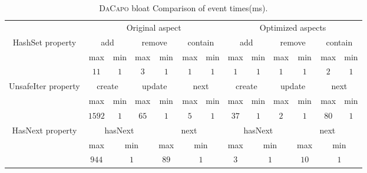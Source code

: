 \begin{table*}[ht]
\centering
\scriptsize
\begin{tabular}{|c|c|c|c|c|c|c||c|c|c|c|c|c|}
\hline
\multirow{1}{*}{}                                                                
     & \multicolumn{6}{c||}{Original aspect} & 
\multicolumn{6}{c|}{Optimized aspects} \\ \cline{1-13} 
                                                                                 
 \multirow{3}{*}{HashSet property}    & \multicolumn{2}{c|}{add}  &
 \multicolumn{2}{c|}{remove} & \multicolumn{2}{c||}{contain} &
 \multicolumn{2}{c|}{add}   &
 \multicolumn{2}{c|}{remove} & \multicolumn{2}{c|}{contain}         \\ \cline{2-13} 
 & max & min & max & min & max & min & max & min & max & min & max & min
 \\\cline{2-13}  
 &  $11$ & $1$   &   $3$     & $1$   &  $1$   & $1$   &   $1$    & $1$   &  $1$   
 & $1$ & $2$ & $1$\\\hline
 
  \multirow{3}{*}{UnsafeIter property}    & \multicolumn{2}{c|}{create}  &
 \multicolumn{2}{c|}{update} & \multicolumn{2}{c||}{next} &
 \multicolumn{2}{c|}{create}   &
 \multicolumn{2}{c|}{update} & \multicolumn{2}{c|}{next}         \\ \cline{2-13} 
 & max & min & max & min & max & min & max & min & max & min & max & min
 \\\cline{2-13}  
 &  $1592$ & $1$   &   $65$     & $1$   &  $5$   & $1$   &   $37$    & $1$   & 
 $2$ & $1$ & $80$ & $1$\\\hline
 
   \multirow{3}{*}{HasNext property}    & \multicolumn{3}{c|}{hasNext}  &
   \multicolumn{3}{c||}{next} &
 \multicolumn{3}{c|}{hasNext}   & \multicolumn{3}{c|}{next} \\ \cline{2-13} 
 
 & \multicolumn{1}{c|}{max} & \multicolumn{2}{c|}{min} &  
 \multicolumn{1}{c|}{max} & \multicolumn{2}{c||}{min} &
 \multicolumn{1}{c|}{max} & \multicolumn{2}{c|}{min} &
 \multicolumn{1}{c|}{max} & \multicolumn{2}{c|}{min}  \\\cline{2-13}  
 &   \multicolumn{1}{c|}{$944$} & \multicolumn{2}{c|}{$1$}   &  
 \multicolumn{1}{c|}{$89$} & \multicolumn{2}{c||}{$1$} &  
 \multicolumn{1}{c|}{$3$}   & \multicolumn{2}{c|}{$1$}   & 
 \multicolumn{1}{c|}{$10$}   & \multicolumn{2}{c|}{$1$}   \\\hline
 
 

\end{tabular}
\caption{\textsc{DaCapo} bloat Comparison of event times(ms).}
\end{table*}
\label{table:eventTime}


